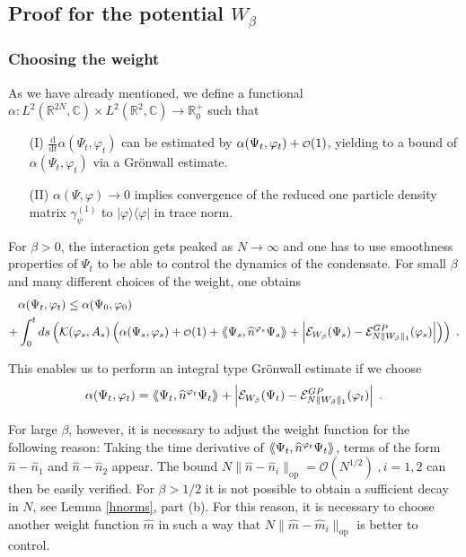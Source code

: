 \documentclass[11pt, english, american]{article}
\newcommand{\landau}{\mbox{\begin{scriptsize}$\mathcal{O}$\end{scriptsize}}}
\newcommand{\laa}{\langle\hspace{-0.08cm}\langle}
\newcommand{\raa}{\rangle\hspace{-0.08cm}\rangle}
\newcommand{\LZ}{L^2(\mathbb{R}^2,\mathbb{C})}
\newcommand{\LZN}{L^2(\mathbb{R}^{2N},\mathbb{C})}
\newcommand{\dt}{\frac{\text{d}}{\text{d}t}}
\renewcommand{\phi}{\varphi}
\begin{document}
\subsection{Proof for the potential $W_\beta$}\label{secthe}

\subsubsection{Choosing the weight}
As we have already mentioned, we define a functional $\alpha:\LZN\times\LZ\to\mathbb{R}^+_0$ such that
\begin{enumerate}
 \item[(I)]
$\dt\alpha(\Psi_t,\phi_t)$ can be estimated by $\alpha(\Psi_t,\phi_t)+\landau(1)$,
yielding to a  bound of $\alpha(\Psi_t,\phi_t)$ via a Gr\"onwall estimate. 
\item[(II)] $\alpha(\Psi,\phi)\to0$
implies convergence of the reduced one particle density matrix $ \gamma^{(1)}_\psi$ to
$|\phi\rangle\langle\phi|$ in trace norm.
\end{enumerate}
For $\beta>0$, the interaction gets peaked as $N\to\infty$ and one has to use smoothness properties of $\Psi_t$ to be able to control the dynamics of the condensate. 
For small $\beta$ and  many different choices of the weight, one obtains
\begin{align*}
&\alpha(\Psi_t,\phi_t)\leq 
\alpha(\Psi_0,\phi_0)
\\
+&
\int_0^ t ds
\left(
\mathcal{K}(\phi_s, A_s)\left(\alpha(\Psi_s,\phi_s)+\landau(1)+\laa\Psi_s,\widehat{n}^{\phi_s}\Psi_s\raa+
\left|\mathcal{E}_{W_\beta}(\Psi_s)-\mathcal{E}_{N \|W_\beta\|_1}^{GP}(\phi_s)\right|\right)
\right)
\;.
\end{align*}

 This enables us to perform an integral type Gr\"onwall estimate if we choose
$$\alpha(\Psi_t,\phi_t)=\laa\Psi_t,\widehat{n}^{\phi_t}\Psi_t\raa+\left|\mathcal{E}_{W_\beta}(\Psi_t)-\mathcal{E}_{N \|W_\beta\|_1}^{GP}(\phi_t)\right|\;.$$

For large $\beta$, however, it is necessary to adjust the weight function for the following reason:
Taking the time derivative of $\laa\Psi_t,\widehat{n}^{\phi_t}\Psi_t\raa$, terms of the form $\widehat{n}-\widehat{n}_1$ and $\widehat{n}-\widehat{n}_2$ appear.
The bound
$N\|\widehat{n}-\widehat{n}_i\|_{\text{op}}=\mathcal{O}(N^{1/2})\; , i=1,2$ can then be easily verified.
For $\beta >1/2$ it is not possible to obtain a sufficient decay in $N$, see
Lemma \ref{hnorms}, part (b).
For this reason, it is necessary to choose another weight function $\widehat{m}$ in such a way that 
$N\|\widehat{m}-\widehat{m}_i\|_{\text{op}}$ is better to control.
\end{document}
